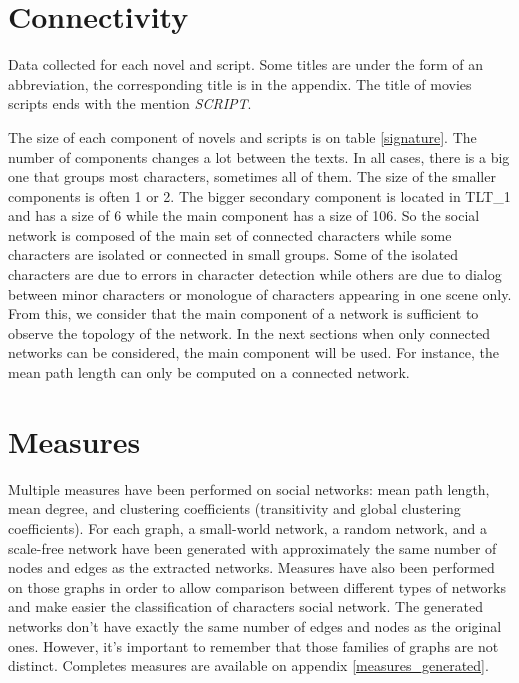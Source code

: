 \documentclass[a4paper, 12pt]{report}
\begin{document}
\section{Connectivity}

\begin{table}[]
\caption{Data collected for each novel and script. Some titles are under the form of an abbreviation, the corresponding title
is in the appendix. The title of movies scripts ends with the mention \textit{SCRIPT}.}
\label{signature}
\end{table}

The size of each component of novels and scripts is on table \ref{signature}. The number of components changes a lot between the texts. In all cases, there is a big one that groups most characters, sometimes all of them. The size of the smaller components is often 1 or 2. The bigger secondary component is located in TLT\_1 and has a size of 6 while the main component has a size of 106. So the social network is composed of the main set of connected characters while some characters are isolated or connected in small groups. Some of the isolated characters are due to errors in character detection while others are due to dialog between minor characters or monologue of characters appearing in one scene only. From this, we consider that the main component of a network is sufficient to observe the topology of the network. In the next sections when only connected networks can be considered, the main component will be used. For instance, the mean path length can only be computed on a connected network.


\section{Measures}
Multiple measures have been performed on social networks: mean path length, mean degree, and clustering coefficients (transitivity and global clustering coefficients). For each graph, a small-world network, a random network, and a scale-free network have been generated with approximately the same number of nodes and edges as the extracted networks. Measures have also been performed on those graphs in order to allow comparison between different types of networks and make easier the classification of characters social network. The generated networks don't have exactly the same number of edges and nodes as the original ones. However, it's important to remember that those families of graphs are not distinct. Completes measures are available on appendix \ref{measures_generated}.\\
\end{document}

